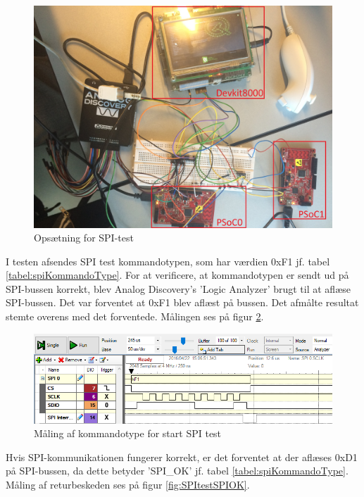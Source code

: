 \begin{figure}[H]
	\centering
	\includegraphics[width=\textwidth]{Test/images/SPItest/SpiTestSetup}
	\caption{Opsætning for SPI-test}
	\label{figure:SpiTestSetup}
\end{figure}


I testen afsendes SPI test kommandotypen, som har værdien 0xF1 jf. tabel \ref{tabel:spiKommandoType}. For at verificere, at kommandotypen er sendt ud på SPI-bussen korrekt, blev Analog Discovery's 'Logic Analyzer' brugt til at aflæse SPI-bussen. Det var forventet at 0xF1 blev aflæst på bussen. Det afmålte resultat stemte overens med det forventede. Målingen ses på figur \ref{fig:SPItestkommandotype}. 

\begin{figure}[H]
	\centering
	\includegraphics[width=\textwidth]{Test/images/SPItest/SPItestkommandotype}
	\caption{Måling af kommandotype for start SPI test}
	\label{fig:SPItestkommandotype}
\end{figure}

Hvis SPI-kommunikationen fungerer korrekt, er det forventet at der aflæses 0xD1 på SPI-bussen, da dette betyder 'SPI\_OK' jf. tabel \ref{tabel:spiKommandoType}. Måling af returbeskeden ses på figur \ref{fig:SPItestSPIOK}.

